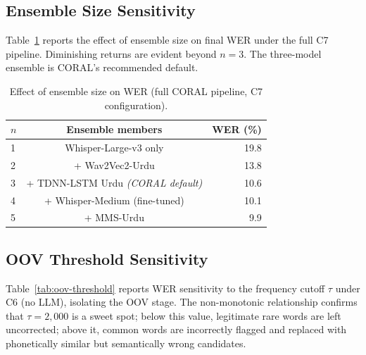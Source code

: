 \subsection{Ensemble Size Sensitivity}
\label{ssec:ensemble-size}

Table~\ref{tab:ensemble-size} reports the effect of ensemble size on final WER under the full C7 pipeline. Diminishing returns are evident beyond $n=3$. The three-model ensemble is CORAL's recommended default.

\begin{table}[h]
    \centering
    \renewcommand{\arraystretch}{1.25}
    \begin{tabular}{lcr}
    \toprule
    \textbf{$n$} & \textbf{Ensemble members} & \textbf{WER (\%)} \\
    \midrule
    1 & Whisper-Large-v3 only                                 & 19.8 \\
    2 & + Wav2Vec2-Urdu                                       & 13.8 \\
    3 & + TDNN-LSTM Urdu \emph{(CORAL default)}               & 10.6 \\
    4 & + Whisper-Medium (fine-tuned)                         & 10.1 \\
    5 & + MMS-Urdu                                            &  9.9 \\
    \bottomrule
    \end{tabular}
    \caption{Effect of ensemble size on WER (full CORAL pipeline, C7 configuration).}
    \label{tab:ensemble-size}
\end{table}

\subsection{OOV Threshold Sensitivity}
\label{ssec:oov-threshold}

Table~\ref{tab:oov-threshold} reports WER sensitivity to the frequency cutoff $\tau$ under C6 (no LLM), isolating the OOV stage. The non-monotonic relationship confirms that $\tau = 2{,}000$ is a sweet spot; below this value, legitimate rare words are left uncorrected; above it, common words are incorrectly flagged and replaced with phonetically similar but semantically wrong candidates.

